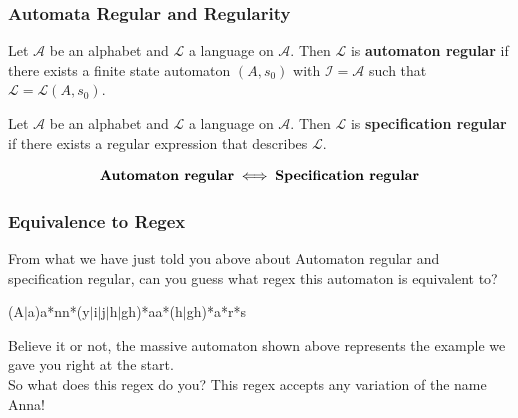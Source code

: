 \documentclass[hyperref={pdfpagemode=UseThumbs, pdfpagelayout=SinglePage, bookmarks=true, },handout,xcolor=dvipsnames]{beamer}
\newcommand{\inputAlphabet}{\mathcal{I}}
\newcommand{\alphabet}{\mathcal{A}}
\newcommand{\aLanguage}{\mathcal{L}}
\begin{document}
\begin{frame}
\frametitle{Automata Regular and Regularity}

\begin{definition}
    Let $\alphabet$ be an alphabet and $\aLanguage$ a language on $\alphabet$.
    Then $\aLanguage$ is \textbf{automaton regular} if there exists a finite state automaton $(A,s_0)$
    with $\inputAlphabet = \alphabet$ such that $\aLanguage = \aLanguage(A,s_0)$.
\end{definition}

\begin{definition}
    Let $\alphabet$ be an alphabet and $\aLanguage$ a language on $\alphabet$.
    Then $\aLanguage$ is \textbf{specification regular} if there exists a
    regular expression that describes $\aLanguage$.
\end{definition}

\begin{theorem}
    \[
    \text{\textbf{Automaton regular}} \iff \text{\textbf{Specification regular}}
    \]
\end{theorem}
\end{frame}

\begin{frame}
\frametitle{Equivalence to Regex}
From what we have just told you above about Automaton regular and specification regular, can you guess what regex  this automaton is equivalent to?

\begin{center}
    (A$|$a)a*nn*(y$|$i$|$j$|$h$|$gh)*aa*(h$|$gh)*a*r*s
\end{center}

Believe it or not, the massive automaton shown above represents the example we gave you right at the start.
\\[1em]
So what does this regex do you? This regex accepts any variation of the name Anna!
\end{frame}
\end{document}

